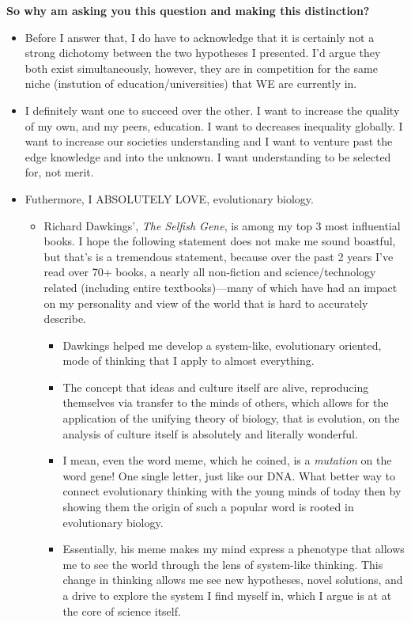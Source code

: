\documentclass[12pt,a4paper]{article}
\begin{document}
\newpage
\textbf{So why am asking you this question and making this distinction?}
    \begin{itemize}
        \item Before I answer that, I do have to acknowledge that it is certainly not a strong dichotomy between the two hypotheses I presented. I'd argue they both exist simultaneously, however, they are in competition for the same niche (instution of education/universities) that WE are currently in.
        \item I definitely want one to succeed over the other. I want to increase the quality of my own, and my peers, education. I want to decreases inequality globally. I want to increase our societies understanding and I want to venture past the edge knowledge and into the unknown. I want understanding to be selected for, not merit. 
        \item Futhermore, I ABSOLUTELY LOVE, evolutionary biology.
            \begin{itemize}
                \item Richard Dawkings', \textit{The Selfish Gene}, is among my top 3 most influential books. I hope the following statement does not make me sound boastful, but that's is a tremendous statement, because over the past 2 years I've read over 70+ books, a nearly all non-fiction and science/technology related (including entire textbooks)---many of which have had an impact on my personality and view of the world that is hard to accurately describe.
                    \begin{itemize}
                        \item Dawkings helped me develop a system-like, evolutionary oriented, mode of thinking that I apply to almost everything. 
                        \item The concept that ideas and culture itself are alive, reproducing themselves via transfer to the minds of others, which allows for the application of the unifying theory of biology, that is evolution, on the analysis of culture itself is absolutely and literally wonderful.
                        \item I mean, even the word meme, which he coined, is a \textit{mutation} on the word gene! One single letter, just like our DNA. What better way to connect evolutionary thinking with the young minds of today then by showing them the origin of such a popular word is rooted in evolutionary biology.
                        \item Essentially, his meme makes my mind express a phenotype that allows me to see the world through the lens of system-like thinking. This change in thinking allows me see new hypotheses, novel solutions, and a drive to explore the system I find myself in, which I argue is at at the core of science itself.

\end{itemize}
\end{itemize}
\end{itemize}
\end{document}
